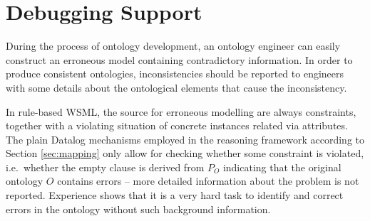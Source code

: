 \def\transdebug{\transtxt{debug}}
\def\pvotype{\predicate{\predsubtxt{v\_otype}}}
\def\pvmincard{\predicate{\predsubtxt{v\_mincard}}}
\def\pvmaxcard{\predicate{\predsubtxt{v\_maxcard}}}
\def\pvuser{\predicate{\predsubtxt{v\_user}}}
\def\axiomid{\ensuremath{Ax_{I\!D}}\xspace}
\def\debugaxioms{\ensuremath{P_{\smtxtit{debug}}}\xspace}

\section{Debugging Support\vspace{-2mm}\label{sec:debugging}}

During the process of ontology development, an ontology engineer
can easily construct an erroneous model containing contradictory
information. In order to produce consistent ontologies,
inconsistencies should be reported to engineers with some details
about the ontological elements that cause the inconsistency.

In rule-based WSML, the source for erroneous modelling are always
constraints, together with a violating situation of concrete
instances related via attributes. The plain Datalog mechanisms
employed in the reasoning framework according to Section
\ref{sec:mapping} only allow for checking whether some constraint
is violated, i.e.\ whether the empty clause is derived from $P_O$
indicating that the original ontology $O$ contains errors -- more
detailed information about the problem is not reported. Experience
shows that it is a very hard task to identify and correct errors
in the ontology without such background information.

